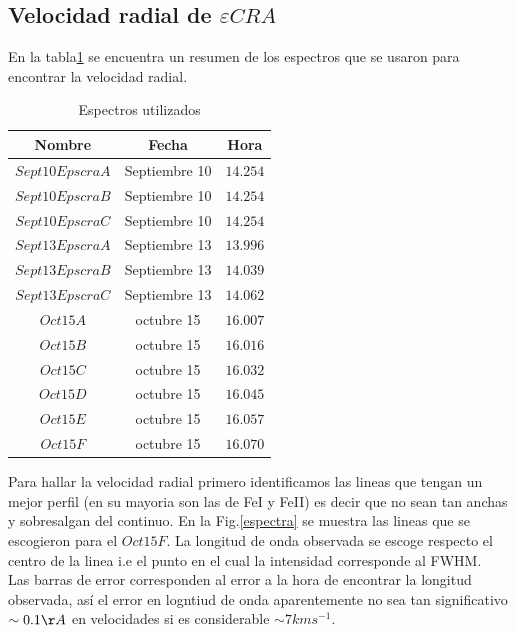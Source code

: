 \documentclass[Proceedings]{ascelike}
\begin{document}
\subsection{Velocidad radial de $\varepsilon CRA$}

En la tabla\ref{spectra} se encuentra un resumen de los espectros que se usaron para encontrar la velocidad radial.\\

\begin{table}
\begin{center}
\begin{tabular}{|c| c |c|}
\hline
Nombre & Fecha & Hora\\
\hline
$Sept10EpscraA$ & Septiembre 10 & $14.254$\\
\hline
$Sept10EpscraB$ & Septiembre 10 & $14.254$\\
\hline
$Sept10EpscraC$ & Septiembre 10 & $14.254$\\
\hline
$Sept13EpscraA$ & Septiembre 13 & $13.996$\\
\hline
$Sept13EpscraB$ & Septiembre 13 & $14.039$\\
\hline
$Sept13EpscraC$ & Septiembre 13 & $14.062$\\
\hline
$Oct15A$ & octubre 15 & $16.007$\\
\hline
$Oct15B$ & octubre 15 & $16.016$\\
\hline
$Oct15C$ & octubre 15 & $16.032$\\
\hline
$Oct15D$ & octubre 15 & $16.045$\\
\hline
$Oct15E$& octubre 15 & $16.057$\\
\hline
$Oct15F$ & octubre 15 & $16.070$\\
\hline
\end{tabular}
\caption{Espectros utilizados\label{spectra}}
\end{center}
\end{table}


Para hallar la velocidad radial primero identificamos las lineas que tengan un mejor perfil (en su mayoria son las de FeI y FeII) es decir que no sean tan anchas y sobresalgan del continuo.
En la Fig.\ref{espectra} se muestra las lineas que se escogieron para el $Oct15F$. La longitud de onda observada
se escoge respecto el centro de la linea i.e el punto en el cual la intensidad corresponde al FWHM. \\

Las barras de error corresponden al error a la hora de encontrar la longitud observada, as\'i el error en logntiud de onda aparentemente no sea tan significativo $\sim 0.1 \AA$ en velocidades si es considerable $\sim 7 kms^{-1}$. \\ 
\end{document}
